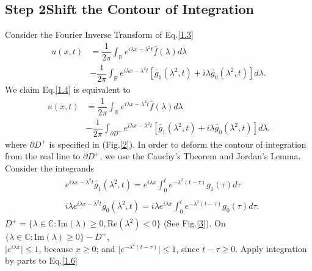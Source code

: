 \documentclass[12pt]{article}
\numberwithin{equation}{section}
\begin{document}
\subsection{Step 2\textemdash Shift the Contour of Integration}
Consider the Fourier Inverse Transform of Eq.\eqref{1.3}
\begin{equation}\label{1.4}
    \begin{split}
    u(x,t)&=\dfrac{1}{2\pi}\int_{\mathbb{R}}e^{i\lambda x-\lambda^2 t}\hat{f}(\lambda)d\lambda\\
    &-\dfrac{1}{2\pi}\int_{\mathbb{R}}e^{i\lambda x-\lambda^2 t}[\tilde{g_1}(\lambda^2,t)+i\lambda \tilde{g_0}(\lambda^2,t)]d\lambda.
    \end{split}
\end{equation}
We claim Eq.\eqref{1.4} is equivalent to
\begin{equation}\label{1.5}
    \begin{split}
    u(x,t)&=\dfrac{1}{2\pi}\int_{\mathbb{R}}e^{i\lambda x-\lambda^2 t}\hat{f}(\lambda)d\lambda\\
    &-\dfrac{1}{2\pi}\int_{\partial D^+}e^{i\lambda x-\lambda^2 t}[\tilde{g_1}(\lambda^2,t)+i\lambda \tilde{g_0}(\lambda^2,t)]d\lambda.
    \end{split}
\end{equation}
where $\partial D^+$ is specified in (Fig.\ref{2}). In order to deform the contour of integration from the real line to $\partial D^+$, we use the Cauchy's Theorem and Jordan's Lemma. Consider the integrands
\begin{align}
    \begin{split}\label{1.6}
    &e^{i\lambda x-\lambda^2 t}\tilde{g_1}(\lambda^2,t)=e^{i\lambda x}\int_{0}^{t} e^{-\lambda^2(t-\tau)}g_1(\tau)d\tau
    \end{split}\\
    \begin{split}\label{1.7}
    &i\lambda e^{i\lambda x-\lambda^2 t}\tilde{g_0}(\lambda^2,t)=i\lambda e^{i\lambda x}\int_{0}^{t} e^{-\lambda^2(t-\tau)}g_0(\tau)d\tau.
    \end{split}
\end{align}
$D^+=\{\lambda\in\mathbb{C}:\text{Im}(\lambda)\geqslant 0, \text{Re}(\lambda^2)<0\}$ (See Fig.\ref{3}). On $\{\lambda\in\mathbb{C}:\text{Im}(\lambda)\geqslant 0\}-D^+$,\\ [1mm] $\vert e^{i\lambda x}\vert \leqslant 1$, because $x\geqslant 0$; and $\vert e^{-\lambda^2(t-\tau)}\vert \leqslant 1$, since $t-\tau\geqslant 0$. Apply integration by parts to Eq.\eqref{1.6}
\end{document}
